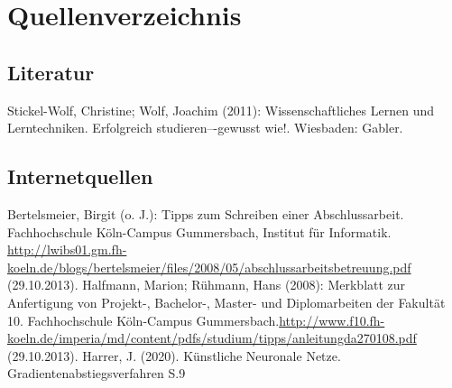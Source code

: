 \documentclass[a4paper,12pt,oneside]{article}
\begin{document}
   \newpage
    \thispagestyle{empty}
   \section{Quellenverzeichnis}
     \subsection{Literatur}
     \renewcommand{\refname}{} %
     \begin{thebibliography}{SW11} %
        Stickel-Wolf, Christine; Wolf, Joachim (2011): Wissenschaftliches Lernen und Lerntechniken. Erfolgreich studieren–-gewusst wie!. Wiesbaden: Gabler. 
     \end{thebibliography} 
          
     \subsection{Internetquellen}
     \begin{thebibliography}{HR08} %
       Bertelsmeier, Birgit (o. J.): Tipps zum Schrei\-b\-en ei\-n\-er Ab\-sch\-luss\-ar\-beit. Fach\-hoch\-schu\-le Köln-Campus Gummersbach, Institut für Informatik. \url{http://lwibs01.gm.fh-koeln.de/blogs/bertelsmeier/files/2008/05/abschlussarbeitsbetreuung.pdf} (29.10.2013).
         Halfmann, Marion; Rühmann, Hans (2008): Merkblatt zur Anfertigung von Projekt-, Bachelor-, Master- und Diplomarbeiten der Fakultät 10. Fachhochschule Köln-Campus Gummersbach.\url{http://www.f10.fh-koeln.de/imperia/md/content/pdfs/studium/tipps/anleitungda270108.pdf} (29.10.2013).
         Harrer, J. (2020). Künstliche Neuronale Netze. Gradientenabstiegsverfahren S.9
      \end{thebibliography} 
  
\end{document}
